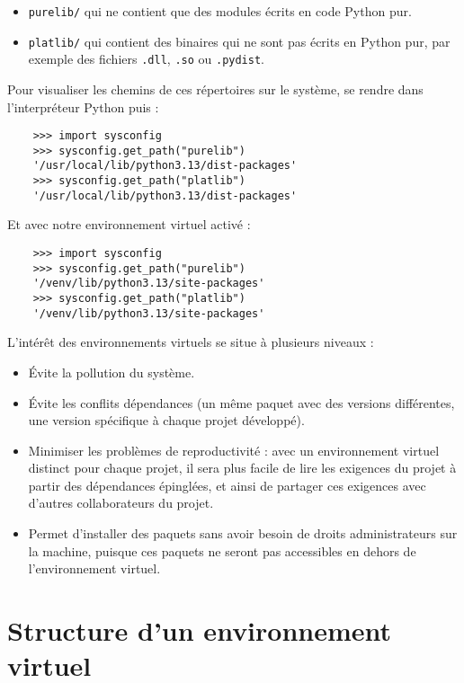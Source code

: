 \begin{itemize}
    \item \texttt{purelib/} qui ne contient que des modules écrits en code Python pur.
    \item \texttt{platlib/} qui contient des binaires qui ne sont pas écrits en Python pur, par exemple des fichiers \texttt{.dll}, \texttt{.so} ou \texttt{.pydist}.
\end{itemize}
\medskip

Pour visualiser les chemins de ces répertoires sur le système, se rendre dans l'interpréteur Python puis :
\begin{verbatim}
    >>> import sysconfig
    >>> sysconfig.get_path("purelib")
    '/usr/local/lib/python3.13/dist-packages'
    >>> sysconfig.get_path("platlib")
    '/usr/local/lib/python3.13/dist-packages'
\end{verbatim}

Et avec notre environnement virtuel activé :
\begin{verbatim}
    >>> import sysconfig
    >>> sysconfig.get_path("purelib")
    '/venv/lib/python3.13/site-packages'
    >>> sysconfig.get_path("platlib")
    '/venv/lib/python3.13/site-packages'
\end{verbatim}

L'intérêt des environnements virtuels se situe à plusieurs niveaux :

\begin{itemize}
    \item Évite la pollution du système.
    \item Évite les conflits dépendances (un même paquet avec des versions différentes, une version spécifique à chaque projet développé).
    \item Minimiser les problèmes de reproductivité : avec un environnement virtuel distinct pour chaque projet, il sera plus facile de lire les exigences du projet à partir des dépendances épinglées, et ainsi de partager ces exigences avec d'autres collaborateurs du projet.
    \item Permet d'installer des paquets sans avoir besoin de droits administrateurs sur la machine, puisque ces paquets ne seront pas accessibles en dehors de l'environnement virtuel.
\end{itemize}

\section{Structure d'un environnement virtuel}

